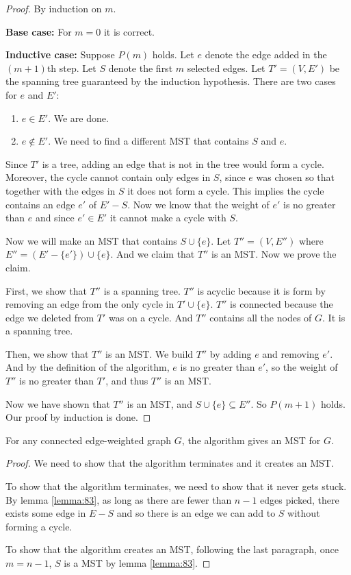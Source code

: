 \documentclass[11pt]{article}
\begin{document}
\begin{proof}
By induction on $m$.

\textbf{Base case:} For $m=0$ it is correct.

\textbf{Inductive case:} Suppose $P(m)$ holds. Let $e$ denote the edge added in the $(m+1)$th step.
Let $S$ denote the first $m$ selected edges. Let $T'=(V,E')$ be the spanning tree guaranteed by the
induction hypothesis. There are two cases for $e$ and $E'$:
\begin{enumerate}
\item $e \in E'$. We are done.
\item $e \not\in E'$. We need to find a different MST that contains $S$ and $e$.
\end{enumerate}

Since $T'$ is a tree, adding an edge that is not in the tree would form a cycle. Moreover, the cycle
cannot contain only edges in $S$, since $e$ was chosen so that together with the edges in $S$ it does
not form a cycle. This implies the cycle contains an edge $e'$ of $E'-S$. Now we know that the weight
of $e'$ is no greater than $e$ and since $e' \in E'$ it cannot make a cycle with $S$.

Now we will make an MST that contains $S \cup \{e\}$. Let $T''=(V,E'')$ where $E''=(E'-\{e'\})\cup
\{e\}$. And we claim that $T''$ is an MST. Now we prove the claim.

First, we show that $T''$ is a spanning tree. $T''$ is acyclic because it is form by removing an edge
from the only cycle in $T' \cup \{e\}$. $T''$ is connected because the edge we deleted from $T'$ was on
a cycle. And $T''$ contains all the nodes of $G$. It is a spanning tree.

Then, we show that $T''$ is an MST. We build $T''$ by adding $e$ and removing $e'$. And by the
definition of the algorithm, $e$ is no greater than $e'$, so the weight of $T''$ is no greater than
$T'$, and thus $T''$ is an MST.

Now we have shown that $T''$ is an MST, and $S \cup \{e\} \subseteq E''$. So $P(m+1)$ holds. Our proof
by induction is done.
\end{proof}

\begin{theorem}
For any connected edge-weighted graph $G$, the algorithm gives an MST for $G$.
\end{theorem}

\begin{proof}
We need to show that the algorithm terminates and it creates an MST.

To show that the algorithm terminates, we need to show that it never gets stuck. By lemma
\ref{lemma:83}, as long as there are fewer than $n-1$ edges picked, there exists some edge in $E-S$ and
so there is an edge we can add to $S$ without forming a cycle.

To show that the algorithm creates an MST, following the last paragraph, once $m=n-1$, $S$ is a MST by
lemma \ref{lemma:83}.
\end{proof}
\end{document}
